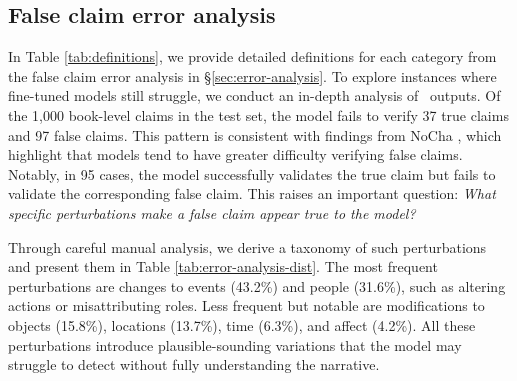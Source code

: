 \subsection{False claim error analysis} \label{appendix:error-analysis}

In Table \ref{tab:definitions}, we provide detailed definitions for each category from the false claim error analysis in \S\ref{sec:error-analysis}. To explore instances where fine-tuned models still struggle, we conduct an in-depth analysis of \qwenftbalanced\ outputs. Of the 1,000 book-level claims in the test set, the model fails to verify 37 true claims and 97 false claims. This pattern is consistent with findings from NoCha \cite{karpinska_one_2024}, which highlight that models tend to have greater difficulty verifying false claims. Notably, in 95 cases, the model successfully validates the true claim but fails to validate the corresponding false claim. This raises an important question: \textit{What specific perturbations make a false claim appear true to the model?} 

Through careful manual analysis, we derive a taxonomy of such perturbations and present them in Table \ref{tab:error-analysis-dist}. The most frequent perturbations are changes to events (43.2\%) and people (31.6\%), such as altering actions or misattributing roles. Less frequent but notable are modifications to objects (15.8\%), locations (13.7\%), time (6.3\%), and affect (4.2\%). All these perturbations introduce plausible-sounding variations that the model may struggle to detect without fully understanding the narrative.

\begin{table*}[ht]
\centering
{}
\caption{Definitions for each category of perturbations that cause a false claim to be misclassified as true in the error analysis in \S\ref{sec:error-analysis}.}
\label{tab:definitions}
\end{table*}



